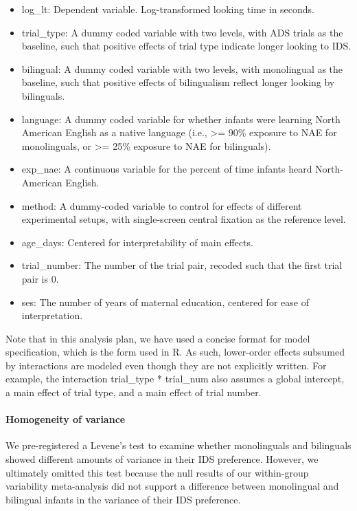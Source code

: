 \documentclass[english,,man,floatsintext]{apa6}
\providecommand{\tightlist}{%
  \setlength{\itemsep}{0pt}\setlength{\parskip}{0pt}}
\begin{document}
\begin{itemize}
\tightlist
\item
  log\_lt: Dependent variable. Log-transformed looking time in seconds.
\item
  trial\_type: A dummy coded variable with two levels, with ADS trials as the baseline, such that positive effects of trial type indicate longer looking to IDS.
\item
  bilingual: A dummy coded variable with two levels, with monolingual as the baseline, such that positive effects of bilingualism reflect longer looking by bilinguals.
\item
  language: A dummy coded variable for whether infants were learning North American English as a native language (i.e., \textgreater{}= 90\% exposure to NAE for monolinguals, or \textgreater{}= 25\% exposure to NAE for bilinguals).
\item
  exp\_nae: A continuous variable for the percent of time infants heard North-American English.
\item
  method: A dummy-coded variable to control for effects of different experimental setups, with single-screen central fixation as the reference level.
\item
  age\_days: Centered for interpretability of main effects.
\item
  trial\_number: The number of the trial pair, recoded such that the first trial pair is 0.
\item
  ses: The number of years of maternal education, centered for ease of interpretation.
\end{itemize}

Note that in this analysis plan, we have used a concise format for model specification, which is the form used in R. As such, lower-order effects subsumed by interactions are modeled even though they are not explicitly written. For example, the interaction trial\_type * trial\_num also assumes a global intercept, a main effect of trial type, and a main effect of trial number.

\hypertarget{homogeneity-of-variance}{%
\paragraph{Homogeneity of variance}\label{homogeneity-of-variance}}

We pre-registered a Levene's test to examine whether monolinguals and bilinguals showed different amounts of variance in their IDS preference. However, we ultimately omitted this test because the null results of our within-group variability meta-analysis did not support a difference between monolingual and bilingual infants in the variance of their IDS preference.
\end{document}

